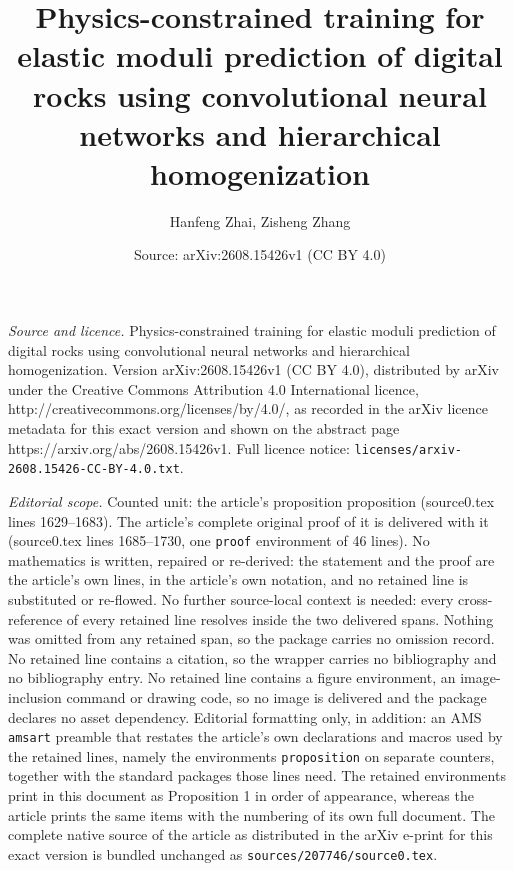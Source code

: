 \documentclass[10pt,a4paper]{amsart}
\title{Physics-constrained training for elastic moduli prediction of digital rocks using convolutional neural networks and hierarchical homogenization}
\author{Hanfeng Zhai, Zisheng Zhang}
\date{Source: arXiv:2608.15426v1 (CC BY 4.0)}
\begin{document}
\maketitle

\noindent\emph{Source and licence.} Physics-constrained training for elastic moduli prediction of digital rocks using convolutional neural networks and hierarchical homogenization. Version arXiv:2608.15426v1 (CC BY 4.0), distributed by arXiv under the Creative Commons Attribution 4.0 International licence, http://creativecommons.org/licenses/by/4.0/, as recorded in the arXiv licence metadata for this exact version and shown on the abstract page https://arxiv.org/abs/2608.15426v1. Full licence notice: \texttt{licenses/arxiv-2608.15426-CC-BY-4.0.txt}.\par\smallskip

\noindent\textit{Editorial scope.} Counted unit: the article's proposition proposition (source0.tex lines 1629--1683). The article's complete original proof of it is delivered with it (source0.tex lines 1685--1730, one \texttt{proof} environment of 46 lines). No mathematics is written, repaired or re-derived: the statement and the proof are the article's own lines, in the article's own notation, and no retained line is substituted or re-flowed.  No further source-local context is needed: every cross-reference of every retained line resolves inside the two delivered spans.  Nothing was omitted from any retained span, so the package carries no omission record.  No retained line contains a citation, so the wrapper carries no bibliography and no bibliography entry.  No retained line contains a figure environment, an image-inclusion command or drawing code, so no image is delivered and the package declares no asset dependency.  Editorial formatting only, in addition: an AMS \texttt{amsart} preamble that restates the article's own declarations and macros used by the retained lines, namely the environments \texttt{proposition} on separate counters, together with the standard packages those lines need.  The retained environments print in this document as Proposition 1 in order of appearance, whereas the article prints the same items with the numbering of its own full document.  The complete native source of the article as distributed in the arXiv e-print for this exact version is bundled unchanged as \texttt{sources/207746/source0.tex}.
\end{document}
